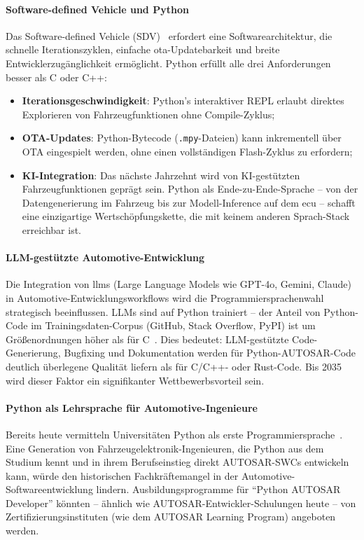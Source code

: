 ﻿\documentclass[12pt,a4paper,twoside]{article}
\begin{document}
\paragraph{Software-defined Vehicle und Python}
Das Software-defined Vehicle (SDV)~\cite{sdv_mckinsey2023} erfordert
eine Softwarearchitektur, die schnelle Iterations\-zyklen, einfache
\gls{ota}-Updatebarkeit und breite Entwicklerzugänglichkeit ermöglicht.
Python erfüllt alle drei Anforderungen besser als C oder C++:
\begin{itemize}
  \item \textbf{Iterationsgeschwindigkeit}: Python's interaktiver REPL erlaubt
        direktes Explorieren von Fahrzeugfunktionen ohne Compile-Zyklus;
  \item \textbf{OTA-Updates}: Python-Bytecode (\texttt{.mpy}-Dateien)
        kann inkrementell über OTA eingespielt werden, ohne
        einen vollständigen Flash-Zyklus zu erfordern;
  \item \textbf{KI-Integration}: Das nächste Jahrzehnt wird von
        KI-gestützten Fahrzeugfunktionen geprägt sein.
        Python als Ende-zu-Ende-Sprache -- von der Datengenerierung im
        Fahrzeug bis zur Modell-Inference auf dem \gls{ecu} -- schafft
        eine einzigartige Wertschöpfungskette, die mit keinem anderen
        Sprach-Stack erreichbar ist.
\end{itemize}

\paragraph{LLM-gestützte Automotive-Entwicklung}
Die Integration von \glspl{llm} (Large Language Models wie GPT-4o,
Gemini, Claude) in Automotive-Entwicklungsworkflows wird
die Programmiersprachenwahl strategisch beeinflussen.
LLMs sind auf Python trainiert -- der Anteil von Python-Code
im Trainingsdaten-Corpus (GitHub, Stack Overflow, PyPI) ist
um Größenordnungen höher als für C~\cite{stackoverflow_survey2024}.
Dies bedeutet: LLM-gestützte Code-Generierung, Bugfixing und
Dokumentation werden für Python-AUTOSAR-Code deutlich überlegene
Qualität liefern als für C/C++- oder Rust-Code.
Bis 2035 wird dieser Faktor ein signifikanter Wettbewerbsvorteil sein.

\paragraph{Python als Lehrsprache für Automotive-Ingenieure}
Bereits heute vermitteln Universitäten Python als erste
Programmiersprache~\cite{python_courses2023}.
Eine Generation von Fahrzeugelektronik-Ingenieuren,
die Python aus dem Studium kennt und in ihrem Berufs\-einstieg
direkt AUTOSAR-SWCs entwickeln kann, würde den historischen
Fachkräftemangel in der Automotive-Softwareentwicklung lindern.
Ausbildungsprogramme für ``Python AUTOSAR Developer'' könnten
-- ähnlich wie AUTOSAR-Entwickler-Schulungen heute -- von
Zertifizierungsinstituten (wie dem AUTOSAR Learning Program)
angeboten werden.
\end{document}
